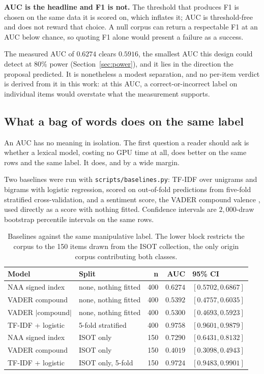 \textbf{AUC is the headline and F1 is not.} The threshold that produces F1 is chosen on the
same data it is scored on, which inflates it; AUC is threshold-free and does not reward that
choice. A null corpus can return a respectable F1 at an AUC below chance, so quoting F1
alone would present a failure as a success.

The measured AUC of $0.6274$ clears $0.5916$, the smallest AUC this design could detect at
$80\%$ power (Section~\ref{sec:power}), and it lies in the direction the proposal predicted.
It is nonetheless a modest separation, and no per-item verdict is derived from it in this
work: at this AUC, a correct-or-incorrect label on individual items would overstate what the
measurement supports.

\subsection{What a bag of words does on the same label}
\label{sec:baselines}

An AUC has no meaning in isolation. The first question a reader should ask is whether a
lexical model, costing no GPU time at all, does better on the same rows and the same label.
It does, and by a wide margin.

Two baselines were run with \texttt{scripts/baselines.py}: TF-IDF over unigrams and bigrams
with logistic regression, scored on out-of-fold predictions from five-fold stratified
cross-validation, and a sentiment score, the VADER compound valence \cite{hutto2014}, used directly as a score
with nothing fitted. Confidence intervals are $2{,}000$-draw bootstrap percentile intervals on
the same rows.

\begin{table}[htbp]
\centering
\begin{tabular}{@{}llrrl@{}}
\toprule
\textbf{Model} & \textbf{Split} & \textbf{n} & \textbf{AUC} & \textbf{95\% CI} \\
\midrule
NAA signed index     & none, nothing fitted & 400 & $0.6274$ & $[0.5702, 0.6867]$ \\
VADER compound       & none, nothing fitted & 400 & $0.5392$ & $[0.4757, 0.6035]$ \\
VADER $|$compound$|$ & none, nothing fitted & 400 & $0.5300$ & $[0.4693, 0.5923]$ \\
TF-IDF + logistic    & 5-fold stratified    & 400 & $0.9758$ & $[0.9601, 0.9879]$ \\
\midrule
NAA signed index     & ISOT only            & 150 & $0.7290$ & $[0.6431, 0.8132]$ \\
VADER compound       & ISOT only            & 150 & $0.4019$ & $[0.3098, 0.4943]$ \\
TF-IDF + logistic    & ISOT only, 5-fold    & 150 & $0.9724$ & $[0.9483, 0.9901]$ \\
\bottomrule
\end{tabular}
\caption{Baselines against the same manipulative label. The lower block restricts the corpus to the 150 items drawn from the ISOT collection, the only origin corpus contributing both classes.}
\label{tab:baselines}
\end{table}

